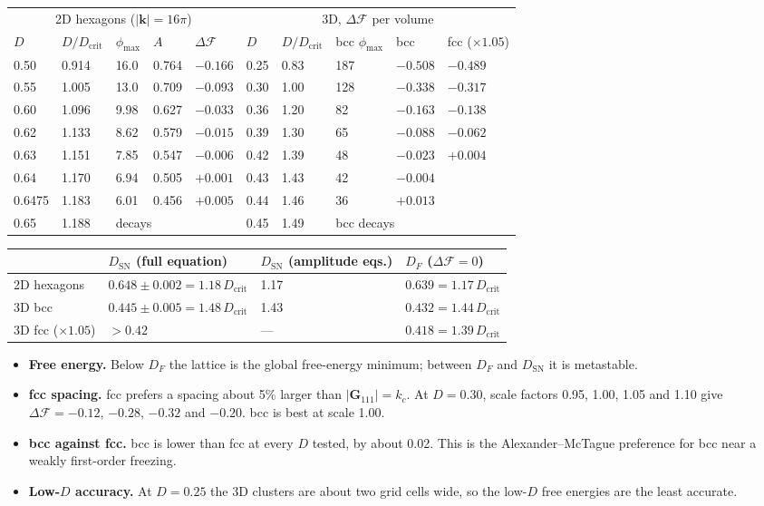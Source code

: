 \documentclass[11pt]{article}
\newcommand{\Dc}{D_{\mathrm{crit}}}
\newcommand{\Dsn}{D_{\mathrm{SN}}}
\begin{document}
\begin{center}
\begin{tabular}{@{}lllll@{\qquad}lllll@{}}
\toprule
\multicolumn{5}{c}{2D hexagons ($|\mathbf k|=16\pi$)} & \multicolumn{5}{c}{3D, $\Delta\mathcal F$ per volume} \\
$D$ & $D/\Dc$ & $\phi_{\max}$ & $A$ & $\Delta\mathcal F$ & $D$ & $D/\Dc$ & bcc $\phi_{\max}$ & bcc & fcc ($\times1.05$) \\
\midrule
0.50 & 0.914 & 16.0 & 0.764 & $-0.166$ & 0.25 & 0.83 & 187 & $-0.508$ & $-0.489$ \\
0.55 & 1.005 & 13.0 & 0.709 & $-0.093$ & 0.30 & 1.00 & 128 & $-0.338$ & $-0.317$ \\
0.60 & 1.096 & 9.98 & 0.627 & $-0.033$ & 0.36 & 1.20 & 82 & $-0.163$ & $-0.138$ \\
0.62 & 1.133 & 8.62 & 0.579 & $-0.015$ & 0.39 & 1.30 & 65 & $-0.088$ & $-0.062$ \\
0.63 & 1.151 & 7.85 & 0.547 & $-0.006$ & 0.42 & 1.39 & 48 & $-0.023$ & $+0.004$ \\
0.64 & 1.170 & 6.94 & 0.505 & $+0.001$ & 0.43 & 1.43 & 42 & $-0.004$ & \\
0.6475 & 1.183 & 6.01 & 0.456 & $+0.005$ & 0.44 & 1.46 & 36 & $+0.013$ & \\
0.65 & 1.188 & \multicolumn{3}{l}{decays} & 0.45 & 1.49 & \multicolumn{3}{l}{bcc decays} \\
\bottomrule
\end{tabular}
\end{center}
\begin{center}
\begin{tabular}{@{}llll@{}}
\toprule
& $\Dsn$ (full equation) & $\Dsn$ (amplitude eqs.) & $D_F$ ($\Delta\mathcal F=0$) \\
\midrule
2D hexagons & $0.648\pm0.002 = 1.18\,\Dc$ & 1.17 & $0.639 = 1.17\,\Dc$ \\
3D bcc & $0.445\pm0.005 = 1.48\,\Dc$ & 1.43 & $0.432 = 1.44\,\Dc$ \\
3D fcc ($\times1.05$) & $>0.42$ & --- & $0.418 = 1.39\,\Dc$ \\
\bottomrule
\end{tabular}
\end{center}
\begin{itemize}
  \item \textbf{Free energy.} Below $D_F$ the lattice is the global
        free-energy minimum; between $D_F$ and $\Dsn$ it is metastable.
  \item \textbf{fcc spacing.} fcc prefers a spacing about 5\% larger than
        $|\mathbf G_{111}|=k_c$. At $D=0.30$, scale factors 0.95, 1.00, 1.05
        and 1.10 give $\Delta\mathcal F=-0.12$, $-0.28$, $-0.32$ and $-0.20$.
        bcc is best at scale 1.00.
  \item \textbf{bcc against fcc.} bcc is lower than fcc at every $D$ tested, by
        about 0.02. This is the Alexander--McTague preference for bcc near a
        weakly first-order freezing.
  \item \textbf{Low-$D$ accuracy.} At $D=0.25$ the 3D clusters are about two
        grid cells wide, so the low-$D$ free energies are the least accurate.
\end{itemize}
\end{document}
